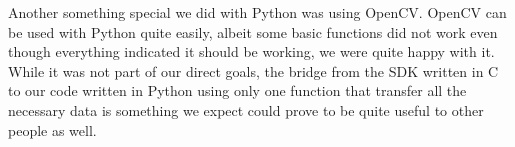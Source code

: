 Another something special we did with Python was using OpenCV. OpenCV can be used with Python quite easily, albeit some basic functions did not work even though everything
indicated it should be working, we were quite happy with it. \\

While it was not part of our direct goals, the bridge from the SDK written in C to our code written in Python using only one function that transfer all the necessary
data is something we expect could prove to be quite useful to other people as well. 


























